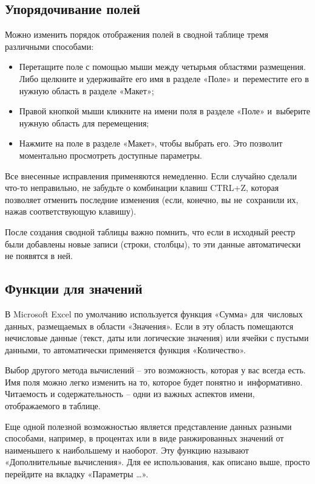 \documentclass{ou}
\begin{document}
\subsection{Упорядочивание полей}
Можно изменить порядок отображения полей в сводной таблице тремя различными способами:
\begin{itemize}[label=-, leftmargin=0em, itemindent=3.35em, nosep]
\item Перетащите поле с помощью мыши между четырьмя областями размещения. Либо щелкните и удерживайте его имя в разделе «Поле» и~переместите его в нужную область в разделе «Макет»;
\item Правой кнопкой мыши кликните на имени поля в разделе «Поле» и~выберите нужную область для перемещения;
\item Нажмите на поле в разделе «Макет», чтобы выбрать его. Это позволит моментально просмотреть доступные параметры.
\end{itemize}

Все внесенные исправления применяются немедленно. Если случайно сделали что-то неправильно, не забудьте о комбинации клавиш CTRL+Z, которая позволяет отменить последние изменения (если, конечно, вы не~сохранили их, нажав соответствующую клавишу).

После создания сводной таблицы важно помнить, что если в исходный реестр были добавлены новые записи (строки, столбцы), то эти данные автоматически не появятся в ней. 

\subsection{Функции для значений}
В Microsoft Excel по умолчанию используется функция «Сумма» для~числовых данных, размещаемых в области «Значения». Если в эту область помещаются нечисловые данные (текст, даты или логические значения) или ячейки с пустыми данными, то автоматически применяется функция «Количество».

Выбор другого метода вычислений -- это возможность, которая у вас всегда есть. Имя поля можно легко изменить на то, которое будет понятно и~информативно. Читаемость и содержательность -- одни из важных аспектов имени, отображаемого в таблице.

Еще одной полезной возможностью является представление данных разными способами, например, в процентах или в виде ранжированных значений от наименьшего к наибольшему и наоборот. Эту функцию называют «Дополнительные вычисления». Для ее использования, как описано выше, просто перейдите на вкладку «Параметры …».
\end{document}

